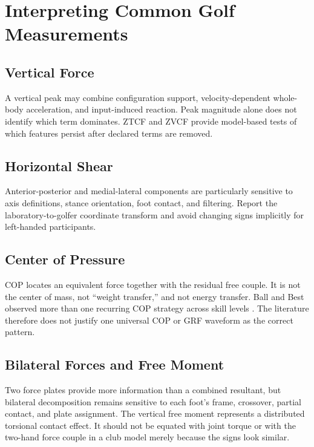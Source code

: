 \section{Interpreting Common Golf Measurements}\label{sec:grf-practical}\label{grf-interpreting-common-golf-measurements}

\subsection{Vertical Force}\label{grf-vertical-force}

A vertical peak may combine configuration support, velocity-dependent whole- body acceleration, and input-induced reaction. Peak magnitude alone does not identify which term dominates. ZTCF and ZVCF provide model-based tests of which features persist after declared terms are removed.

\subsection{Horizontal Shear}\label{grf-horizontal-shear}

Anterior-posterior and medial-lateral components are particularly sensitive to axis definitions, stance orientation, foot contact, and filtering. Report the laboratory-to-golfer coordinate transform and avoid changing signs implicitly for left-handed participants.

\subsection{Center of Pressure}\label{grf-center-of-pressure}

COP locates an equivalent force together with the residual free couple. It is not the center of mass, not ``weight transfer,'' and not energy transfer. Ball and Best observed more than one recurring COP strategy across skill levels \citep{ballbest2007}. The literature therefore does not justify one universal COP or GRF waveform as the correct pattern.

\subsection{Bilateral Forces and Free Moment}\label{grf-bilateral-forces-and-free-moment}

Two force plates provide more information than a combined resultant, but bilateral decomposition remains sensitive to each foot's frame, crossover, partial contact, and plate assignment. The vertical free moment represents a distributed torsional contact effect. It should not be equated with joint torque or with the two-hand force couple in a club model merely because the signs look similar.

